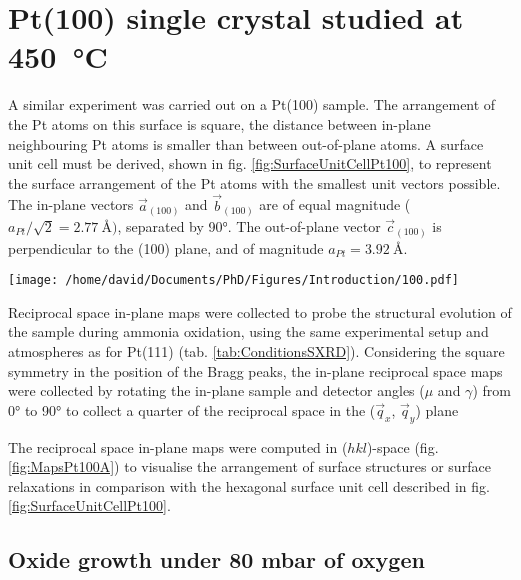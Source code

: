 \section{Pt(100) single crystal studied at \qty{450}{\degreeCelsius}} \label{sec:SXRD100}

A similar experiment was carried out on a Pt(100) sample.
The arrangement of the Pt atoms on this surface is square, the distance between in-plane neighbouring Pt atoms is smaller than between out-of-plane atoms.
A surface unit cell must be derived, shown in fig. \ref{fig:SurfaceUnitCellPt100}, to represent the surface arrangement of the Pt atoms with the smallest unit vectors possible.
The in-plane vectors $\vec{a}_{(100)}$ and $\vec{b}_{(100)}$ are of equal magnitude ($a_{Pt} / \sqrt{2} = \qty{2.77}{\angstrom})$, separated by \ang{90}.
The out-of-plane vector $\vec{c}_{(100)}$ is perpendicular to the (100) plane, and of magnitude $a_{Pt} = \qty{3.92}{\angstrom}$.

\begin{SCfigure}
    \centering
    \texttt{[image: /home/david/Documents/PhD/Figures/Introduction/100.pdf]}
    \caption{
        Face-entered cubic unit cell of Pt with $(100)$ crystallographic plane drawn in green.
        $\vec{a}_{(100)}$, $\vec{b}_{(100)}$ and $\vec{c}_{(100)}$ are the $(100)$ surface unit cell vectors.
    }
    \label{fig:SurfaceUnitCellPt100}
\end{SCfigure}

Reciprocal space in-plane maps were collected to probe the structural evolution of the sample during ammonia oxidation, using the same experimental setup and atmospheres as for Pt(111) (tab. \ref{tab:ConditionsSXRD}).
Considering the square symmetry in the position of the Bragg peaks, the in-plane reciprocal space maps were collected by rotating the in-plane sample and detector angles ($\mu$ and $\gamma$) from \ang{0} to \ang{90} to collect a quarter of the reciprocal space in the ($\vec{q}_x$, $\vec{q}_y$) plane

The reciprocal space in-plane maps were computed in ($hkl$)-space (fig. \ref{fig:MapsPt100A}) to visualise the arrangement of surface structures or surface relaxations in comparison with the hexagonal surface unit cell described in fig. \ref{fig:SurfaceUnitCellPt100}.

\subsection{Oxide growth under 80 mbar of oxygen}

